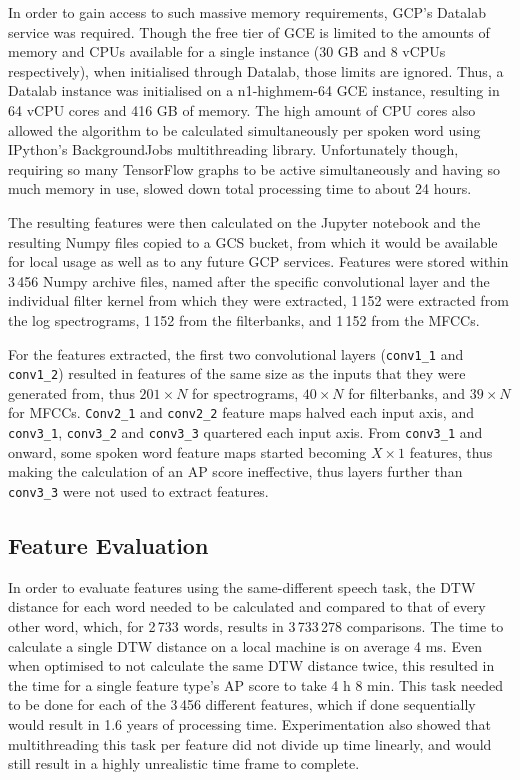 In order to gain access to such massive memory requirements, GCP's Datalab service was required.
Though the free tier of GCE is limited to the amounts of memory and CPUs available for a single instance (30 GB and 8 vCPUs respectively), when initialised through Datalab, those limits are ignored.
Thus, a Datalab instance was initialised on a n1-highmem-64 GCE instance, resulting in 64 vCPU cores and 416 GB of memory.
The high amount of CPU cores also allowed the algorithm to be calculated simultaneously per spoken word using IPython's BackgroundJobs multithreading library.
Unfortunately though, requiring so many TensorFlow graphs to be active simultaneously and having so much memory in use, slowed down total processing time to about 24 hours.

The resulting features were then calculated on the Jupyter notebook and the resulting Numpy files copied to a GCS bucket, from which it would be available for local usage as well as to any future GCP services.
Features were stored within 3\,456 Numpy archive files, named after the specific convolutional layer and the individual filter kernel from which they were extracted, 1\,152 were extracted from the log spectrograms, 1\,152 from the filterbanks, and 1\,152 from the MFCCs. 

For the features extracted, the first two convolutional layers (\texttt{conv1\_1} and \texttt{conv1\_2}) resulted in features of the same size as the inputs that they were generated from, thus $201 \times N$ for spectrograms, $40 \times N$ for filterbanks, and $39 \times N$ for MFCCs.
\texttt{Conv2\_1} and \texttt{conv2\_2} feature maps halved each input axis, and \texttt{conv3\_1}, \texttt{conv3\_2} and \texttt{conv3\_3} quartered each input axis.
From \texttt{conv3\_1} and onward, some spoken word feature maps started becoming $X\times 1$ features, thus making the calculation of an AP score ineffective, thus layers further than \texttt{conv3\_3} were not used to extract features.

\subsection{Feature Evaluation} \label{evaluation}

In order to evaluate features using the same-different speech task, the DTW distance for each word needed to be calculated and compared to that of every other word, which, for 2\,733 words, results in 3\,733\,278 comparisons.
The time to calculate a single DTW distance on a local machine is on average 4 ms.
Even when optimised to not calculate the same DTW distance twice, this resulted in the time for a single feature type's AP score to take 4 h 8 min.
This task needed to be done for each of the 3\,456 different features, which if done sequentially would result in 1.6 years of processing time.
Experimentation also showed that multithreading this task per feature did not divide up time linearly, and would still result in a highly unrealistic time frame to complete.

